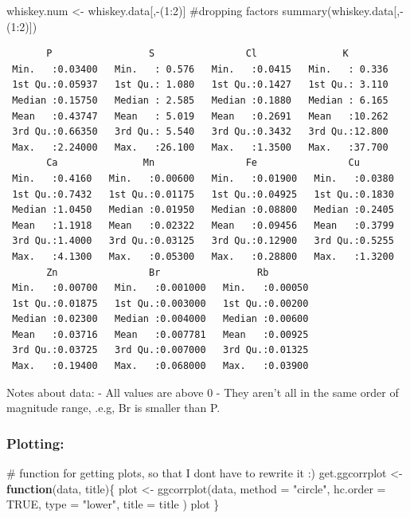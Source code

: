 \documentclass[
  letterpaper,
  DIV=11,
  numbers=noendperiod]{scrartcl}
\newenvironment{Shaded}{\begin{snugshade}}{\end{snugshade}}
\newcommand{\AttributeTok}[1]{\textcolor[rgb]{0.40,0.45,0.13}{#1}}
\newcommand{\CommentTok}[1]{\textcolor[rgb]{0.37,0.37,0.37}{#1}}
\newcommand{\ConstantTok}[1]{\textcolor[rgb]{0.56,0.35,0.01}{#1}}
\newcommand{\ControlFlowTok}[1]{\textcolor[rgb]{0.00,0.23,0.31}{\textbf{#1}}}
\newcommand{\DecValTok}[1]{\textcolor[rgb]{0.68,0.00,0.00}{#1}}
\newcommand{\FunctionTok}[1]{\textcolor[rgb]{0.28,0.35,0.67}{#1}}
\newcommand{\NormalTok}[1]{\textcolor[rgb]{0.00,0.23,0.31}{#1}}
\newcommand{\OtherTok}[1]{\textcolor[rgb]{0.00,0.23,0.31}{#1}}
\newcommand{\SpecialCharTok}[1]{\textcolor[rgb]{0.37,0.37,0.37}{#1}}
\newcommand{\StringTok}[1]{\textcolor[rgb]{0.13,0.47,0.30}{#1}}
\begin{document}
\begin{Shaded}
\begin{Highlighting}[]
\NormalTok{whiskey.num }\OtherTok{\textless{}{-}}\NormalTok{ whiskey.data[,}\SpecialCharTok{{-}}\NormalTok{(}\DecValTok{1}\SpecialCharTok{:}\DecValTok{2}\NormalTok{)] }\CommentTok{\#dropping factors }
\FunctionTok{summary}\NormalTok{(whiskey.data[,}\SpecialCharTok{{-}}\NormalTok{(}\DecValTok{1}\SpecialCharTok{:}\DecValTok{2}\NormalTok{)])}
\end{Highlighting}
\end{Shaded}

\begin{verbatim}
       P                 S                Cl               K         
 Min.   :0.03400   Min.   : 0.576   Min.   :0.0415   Min.   : 0.336  
 1st Qu.:0.05937   1st Qu.: 1.080   1st Qu.:0.1427   1st Qu.: 3.110  
 Median :0.15750   Median : 2.585   Median :0.1880   Median : 6.165  
 Mean   :0.43747   Mean   : 5.019   Mean   :0.2691   Mean   :10.262  
 3rd Qu.:0.66350   3rd Qu.: 5.540   3rd Qu.:0.3432   3rd Qu.:12.800  
 Max.   :2.24000   Max.   :26.100   Max.   :1.3500   Max.   :37.700  
       Ca               Mn                Fe                Cu        
 Min.   :0.4160   Min.   :0.00600   Min.   :0.01900   Min.   :0.0380  
 1st Qu.:0.7432   1st Qu.:0.01175   1st Qu.:0.04925   1st Qu.:0.1830  
 Median :1.0450   Median :0.01950   Median :0.08800   Median :0.2405  
 Mean   :1.1918   Mean   :0.02322   Mean   :0.09456   Mean   :0.3799  
 3rd Qu.:1.4000   3rd Qu.:0.03125   3rd Qu.:0.12900   3rd Qu.:0.5255  
 Max.   :4.1300   Max.   :0.05300   Max.   :0.28800   Max.   :1.3200  
       Zn                Br                 Rb         
 Min.   :0.00700   Min.   :0.001000   Min.   :0.00050  
 1st Qu.:0.01875   1st Qu.:0.003000   1st Qu.:0.00200  
 Median :0.02300   Median :0.004000   Median :0.00600  
 Mean   :0.03716   Mean   :0.007781   Mean   :0.00925  
 3rd Qu.:0.03725   3rd Qu.:0.007000   3rd Qu.:0.01325  
 Max.   :0.19400   Max.   :0.068000   Max.   :0.03900  
\end{verbatim}

Notes about data: - All values are above 0 - They aren't all in the same
order of magnitude range, .e.g, Br is smaller than P.

\subsubsection{Plotting:}\label{plotting}

\begin{Shaded}
\begin{Highlighting}[]
\CommentTok{\# function for getting plots, so that I don\textquotesingle{}t have to rewrite it :)}
\NormalTok{get.ggcorrplot }\OtherTok{\textless{}{-}} \ControlFlowTok{function}\NormalTok{(data, title)\{}
\NormalTok{  plot }\OtherTok{\textless{}{-}} \FunctionTok{ggcorrplot}\NormalTok{(data,}
    \AttributeTok{method =} \StringTok{"circle"}\NormalTok{,}
    \AttributeTok{hc.order =} \ConstantTok{TRUE}\NormalTok{,}
    \AttributeTok{type =} \StringTok{"lower"}\NormalTok{,}
    \AttributeTok{title =}\NormalTok{ title}
\NormalTok{    )}
\NormalTok{  plot}
\NormalTok{\}}
\end{Highlighting}
\end{Shaded}
\end{document}
